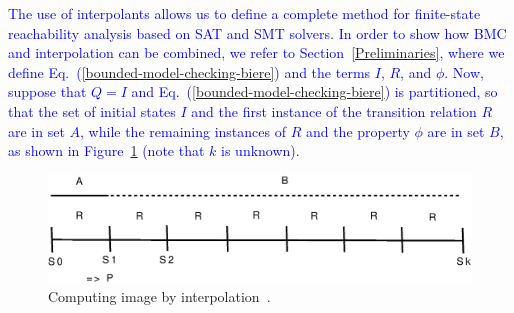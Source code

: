 \documentclass{cta-author}
\begin{document}
\textcolor{blue}{The use of interpolants allows us to define a complete method for finite-state reachability analysis based on SAT and SMT solvers.}
%
\textcolor{blue}{In order to show how BMC and interpolation can be combined, we refer to Section~\ref{Preliminaries}, where we define Eq.~(\ref{bounded-model-checking-biere}) and the terms $I$, $R$, and $\phi$. Now, suppose that $Q=I$ and Eq.~(\ref{bounded-model-checking-biere}) is partitioned, so that the set of initial states $I$ and the first instance of the transition relation $R$ are in set $A$, while the remaining instances of $R$ and the property $\phi$ are in set $B$, as shown in Figure~\ref{figure:computing-image-by-interpolation} (note that $k$ is unknown).}
%
\begin{figure}[ht]
	\centering
	\includegraphics[width=\columnwidth]{interpolants}
	\caption{Computing image by interpolation~\cite{McMillan03}.}
	\label{figure:computing-image-by-interpolation}
\end{figure}
\end{document}
